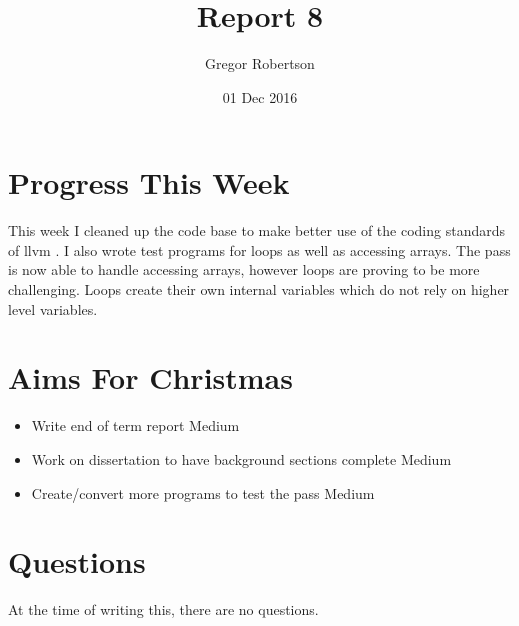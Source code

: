 \documentclass{article}
\title{Report 8}
\author{Gregor Robertson}
\date{01 Dec 2016}
\begin{document}
 
\maketitle
 
\section*{Progress This Week}
This week I cleaned up the code base to make better use of the coding standards of llvm \cite{standards}. I also wrote test programs for loops as well as accessing arrays. The pass is now able to handle accessing arrays, however loops are proving to be more challenging. Loops create their own internal variables which do not rely on higher level variables. 

\section*{Aims For Christmas}
\begin{itemize}
	\item Write end of term report \colorbox{BurntOrange}{\color{Black}Medium}
	\item Work on dissertation to have background sections complete \colorbox{BurntOrange}{\color{Black}Medium}
	\item Create/convert more programs to test the pass \colorbox{BurntOrange}{\color{Black}Medium}
\end{itemize}

\section*{Questions}
At the time of writing this, there are no questions.

\medskip
 
\printbibliography
\end{document}
